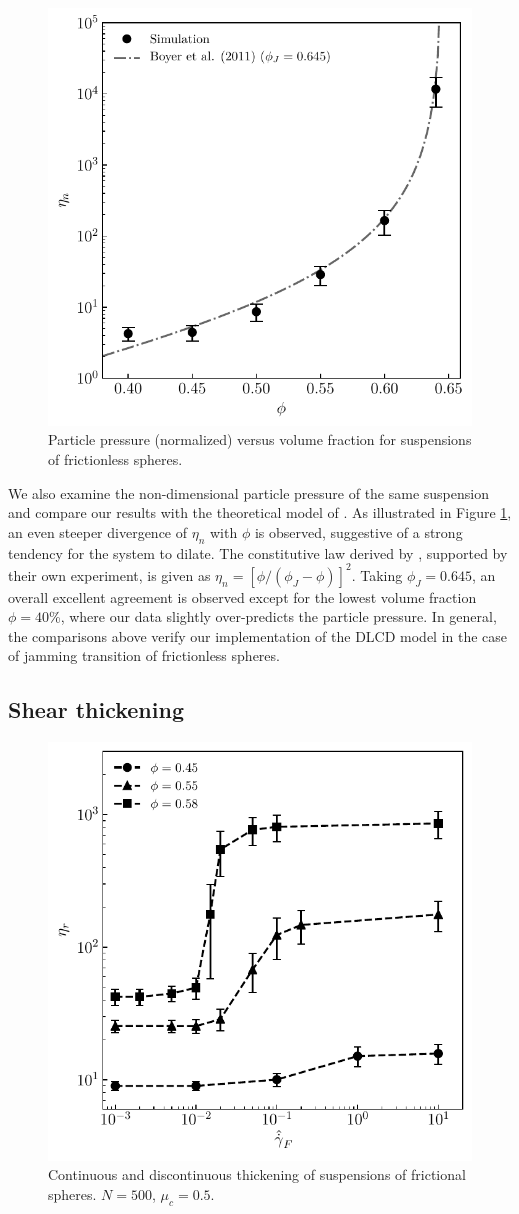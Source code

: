 \begin{figure}%
  \centering
  \includegraphics[width=0.64\columnwidth]{figs/curve_pp_fricless.pdf}
  \caption{Particle pressure (normalized) versus volume fraction for suspensions of frictionless spheres.}
  \label{fig:pres}
\end{figure}

We also examine the non-dimensional particle pressure of the same suspension and compare our results with the theoretical model of \cite{Boyer_Guaz_Poul_2011}. As illustrated in Figure \ref{fig:pres}, an even steeper divergence of $\eta_n$ with $\phi$ is observed, suggestive of a strong tendency for the system to dilate. The constitutive law derived by \cite{Boyer_Guaz_Poul_2011}, supported by their own experiment, is given as $\eta_n=[\phi/(\phi_J-\phi)]^2$. Taking $\phi_J=0.645$, an overall excellent agreement is observed except for the lowest volume fraction $\phi=40$\%, where our data slightly over-predicts the particle pressure. In general, the comparisons above verify our implementation of the DLCD model in the case of jamming transition of frictionless spheres. 


\subsection{Shear thickening}

\begin{figure}%
  \centering
  \includegraphics[width=0.64\columnwidth]{figs/curve_visc_mu0.5.pdf}
  \caption{Continuous and discontinuous thickening of suspensions of frictional spheres. $N=500$, $\mu_c=0.5$.}
  \label{fig:thick}
\end{figure}

